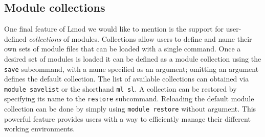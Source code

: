 \subsection{Module collections}

One final feature of Lmod we would like to mention is the support for user-defined
\emph{collections} of modules. Collections allow users to define and name their
own sets of module files that can be loaded with a single command. Once a desired
set of modules is loaded it can be defined as a module collection using the
\texttt{\small save} subcommand, with a name specified as an argument; omitting an
argument defines the default collection. The list of available collections
can obtained via \texttt{\small module savelist} or the shorthand
\texttt{\small ml sl}. A collection can be restored by specifying its name to the
\texttt{\small restore} subcommand. Reloading the default module collection can be
done by simply using \texttt{\small module restore} without argument.
This powerful feature provides users with a way to efficiently manage their
different working environments.



%

